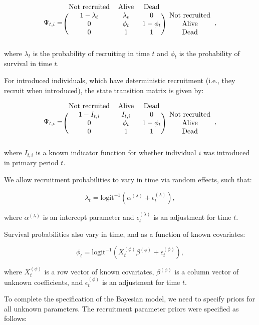 \documentclass[9pt,twoside,lineno]{pnas-new}
\begin{document}
\[
\Psi_{t, i} =
\begin{blockarray}{cccc}
  \text{Not recruited} & \text{Alive} & \text{Dead} \\
\begin{block}{(ccc)c}
  1 - \lambda_t & \lambda_t & 0 & \text{Not recruited} \\
  0 & \phi_t & 1 - \phi_t & \text{Alive} \\
  0 & 1 & 1 & \text{Dead} \\
\end{block}
\end{blockarray},
\] where \(\lambda_t\) is the probability of recruiting in time \(t\)
and \(\phi_t\) is the probability of survival in time \(t\).

For introduced individuals, which have deterministic recruitment (i.e.,
they recruit when introduced), the state transition matrix is given by:

\[
\Psi_{t, i} =
\begin{blockarray}{cccc}
  \text{Not recruited} & \text{Alive} & \text{Dead} \\
\begin{block}{(ccc)c}
  1 - I_{t, i} & I_{t, i} & 0 & \text{Not recruited} \\
  0 & \phi_t & 1 - \phi_t & \text{Alive} \\
  0 & 1 & 1 & \text{Dead} \\
\end{block}
\end{blockarray},
\] where \(I_{t, i}\) is a known indicator function for whether
individual \(i\) was introduced in primary period \(t\).

We allow recruitment probabilities to vary in time via random effects,
such that:

\[\lambda_t = \text{logit}^{-1}(\alpha^{(\lambda)} + \epsilon^{(\lambda)}_t),\]

where \(\alpha^{(\lambda)}\) is an intercept parameter and
\(\epsilon^{(\lambda)}_t\) is an adjustment for time \(t\).

Survival probabilities also vary in time, and as a function of known
covariates:

\[\phi_t = \text{logit}^{-1}(X^{(\phi)}_t \beta^{(\phi)} + \epsilon^{(\phi)}_t),\]

where \(X^{(\phi)}_t\) is a row vector of known covariates,
\(\beta^{(\phi)}\) is a column vector of unknown coefficients, and
\(\epsilon^{(\phi)}_t\) is an adjustment for time \(t\).

To complete the specification of the Bayesian model, we need to specify
priors for all unknown parameters. The recruitment parameter priors were
specified as follows:
\end{document}
